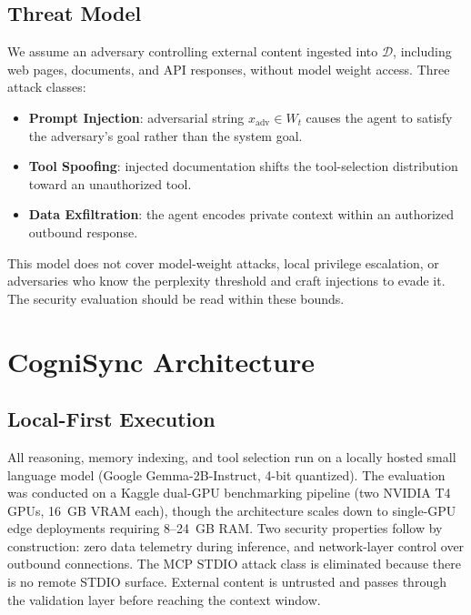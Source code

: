 \documentclass[sigconf,authordraft]{acmart}
\begin{document}
\subsection{Threat Model}

We assume an adversary controlling external content ingested into
$\mathcal{D}$, including web pages, documents, and API responses, without
model weight access. Three attack classes:

\begin{itemize}
\item \textbf{Prompt Injection}: adversarial string $x_{\mathrm{adv}} \in W_t$
  causes the agent to satisfy the adversary's goal rather than the
  system goal.
\item \textbf{Tool Spoofing}: injected documentation shifts the
  tool-selection distribution toward an unauthorized tool.
\item \textbf{Data Exfiltration}: the agent encodes private context
  within an authorized outbound response.
\end{itemize}

This model does not cover model-weight attacks, local privilege
escalation, or adversaries who know the perplexity threshold and craft
injections to evade it. The security evaluation should be read within
these bounds.

\section{CogniSync Architecture}

\subsection{Local-First Execution}

All reasoning, memory indexing, and tool selection run on a locally
hosted small language model (Google Gemma-2B-Instruct, 4-bit quantized). The evaluation was
conducted on a Kaggle dual-GPU benchmarking pipeline (two NVIDIA T4 GPUs,
16~GB VRAM each), though the architecture scales down to single-GPU edge
deployments requiring 8--24~GB RAM. Two security properties follow by construction: zero data
telemetry during inference, and network-layer control over outbound
connections. The MCP STDIO attack class is eliminated because there is
no remote STDIO surface. External content is untrusted and passes through
the validation layer before reaching the context window.
\end{document}
